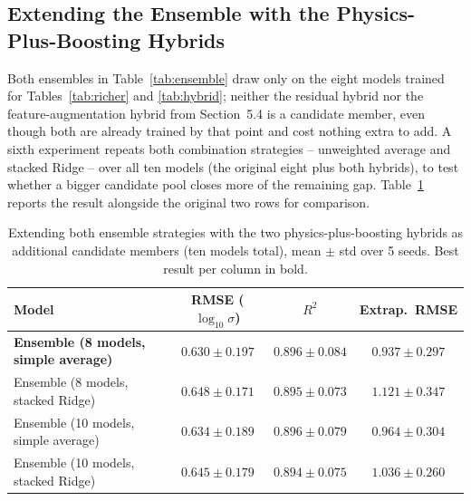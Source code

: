 \documentclass[11pt]{article}
\begin{document}
\subsection{Extending the Ensemble with the Physics-Plus-Boosting Hybrids}

Both ensembles in Table~\ref{tab:ensemble} draw only on the eight models trained for Tables~\ref{tab:richer} and \ref{tab:hybrid}; neither the residual hybrid nor the feature-augmentation hybrid from Section~5.4 is a candidate member, even though both are already trained by that point and cost nothing extra to add. A sixth experiment repeats both combination strategies -- unweighted average and stacked Ridge -- over all ten models (the original eight plus both hybrids), to test whether a bigger candidate pool closes more of the remaining gap. Table~\ref{tab:ensemble2} reports the result alongside the original two rows for comparison.

\begin{table}[h]
\centering
\caption{Extending both ensemble strategies with the two physics-plus-boosting hybrids as additional candidate members (ten models total), mean $\pm$ std over 5 seeds. Best result per column in bold.}
\label{tab:ensemble2}
\begin{tabular}{lccc}
\toprule
Model & RMSE ($\log_{10}\sigma$) & $R^2$ & Extrap.\ RMSE \\
\midrule
\textbf{Ensemble (8 models, simple average)}   & $\mathbf{0.630 \pm 0.197}$ & $0.896 \pm 0.084$ & $\mathbf{0.937 \pm 0.297}$ \\
Ensemble (8 models, stacked Ridge)             & $0.648 \pm 0.171$ & $0.895 \pm 0.073$ & $1.121 \pm 0.347$ \\
Ensemble (10 models, simple average)           & $0.634 \pm 0.189$ & $\mathbf{0.896 \pm 0.079}$ & $0.964 \pm 0.304$ \\
Ensemble (10 models, stacked Ridge)            & $0.645 \pm 0.179$ & $0.894 \pm 0.075$ & $1.036 \pm 0.260$ \\
\bottomrule
\end{tabular}
\end{table}
\end{document}
